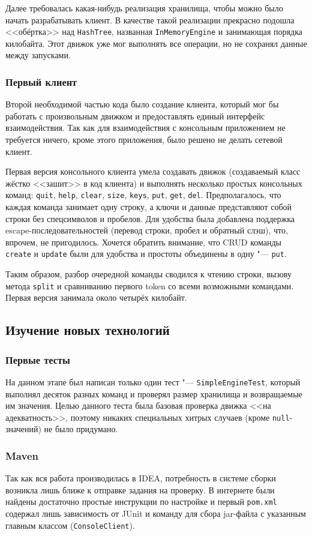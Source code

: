 \documentclass[a4paper]{article}
\renewcommand{\t}{\texttt}
\begin{document}
  Далее требовалась какая-нибудь реализация хранилища, чтобы можно было начать разрабатывать клиент.
  В качестве такой реализации прекрасно подошла <<обёртка>> над \t{HashTree}, названная \t{InMemoryEngine} и
  занимающая порядка килобайта. Этот движок уже мог выполнять все операции, но не сохранял данные между запусками.

\subsubsection{Первый клиент}
  Второй необходимой частью кода было создание клиента, который мог бы работать с произвольным движком
  и предоставлять единый интерфейс взаимодействия. Так как для взаимодействия с консольным приложением
  не требуется ничего, кроме этого приложения, было решено не делать сетевой клиент.

  Первая версия консольного клиента умела создавать движок (создаваемый класс жёстко <<зашит>> в код
  клиента) и выполнять несколько простых консольных команд: \t{quit}, \t{help}, \t{clear}, \t{size},
  \t{keys}, \t{put}, \t{get}, \t{del}. Предполагалось, что каждая команда занимает одну строку, а
  ключи и данные представляют собой строки без спецсимволов и пробелов. Для удобства была добавлена поддержка
  escape-последовательностей (перевод строки, пробел и обратный слэш), что, впрочем, не пригодилось.
  Хочется обратить внимание, что CRUD команды \t{create} и \t{update} были для удобства и простоты
  объединены в одну "--- \t{put}.

  Таким образом, разбор очередной команды сводился к чтению строки, вызову метода \t{split} и сравниванию
  первого token со всеми возможными командами. Первая версия занимала около четырёх килобайт.

\subsection{Изучение новых технологий}
\subsubsection{Первые тесты}
  На данном этапе был написан только один тест "--- \t{SimpleEngineTest}, который выполнял десяток
  разных команд и проверял размер хранилища и возвращаемые им значения. Целью данного теста
  была базовая проверка движка <<на адекватность>>, поэтому никаких специальных хитрых случаев
  (кроме \t{null}-значений) не было придумано.

\subsubsection{Maven}
  Так как вся работа производилась в IDEA, потребность в системе сборки возникла лишь ближе к отправке задания
  на проверку. В интернете были найдены достаточно простые инструкции по настройке и первый \t{pom.xml} содержал
  лишь зависимость от JUnit и команду для сбора jar-файла с указанным главным классом (\t{ConsoleClient}).
\end{document}
